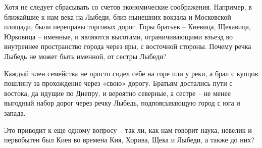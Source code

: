 Хотя не следует сбрасывать со счетов экономические соображения. Например, в ближайшие к нам века на Лыбеди, близ нынешних вокзала и Московской площади, были переправы торговых дорог. Горы братьев – Киевица, Щекавица, Юрковица – именные, и являются высотами, ограничивающими взъезд во внутреннее пространство города через яры, с восточной стороны. Почему речка Лыбедь не может быть именной, от сестры Лыбеди? 

Каждый член семейства не просто сидел себе на горе или у реки, а брал с купцов пошлину за прохождение через «свою» дорогу. Братьям достались пути с востока, да идущие по Днепру, и вероятно северные, а сестре – не менее выгодный набор дорог через речку Лыбедь, подпоясывающую город с юга и запада.

Это приводит к еще одному вопросу – так ли, как нам говорит наука, невелик и первобытен был Киев во времена Кия, Хорива, Щека и Лыбеди, а также до них?
